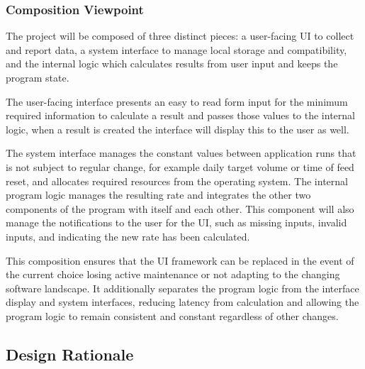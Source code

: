 \documentclass[onecolumn, draftclsnofoot,10pt, compsoc]{IEEEtran}
\begin{document}
\subsubsection{Composition Viewpoint}
The project will be composed of three distinct pieces: a user-facing UI to collect and report data, a system interface to manage local storage and compatibility, and the internal logic which calculates results from user input and keeps the program state.

The user-facing interface presents an easy to read form input for the minimum required information to calculate a result and passes those values to the internal logic, when a result is created the interface will display this to the user as well.

The system interface manages the constant values between application runs that is not subject to regular change, for example daily target volume or time of feed reset, and allocates required resources from the operating system.
The internal program logic manages the resulting rate and integrates the other two components of the program with itself and each other.
This component will also manage the notifications to the user for the UI, such as missing inputs, invalid inputs, and indicating the new rate has been calculated.

This composition ensures that the UI framework can be replaced in the event of the current choice losing active maintenance or not adapting to the changing software landscape.
It additionally separates the program logic from the interface display and system interfaces, reducing latency from calculation and allowing the program logic to remain consistent and constant regardless of other changes.

\subsection{Design Rationale}
\end{document}
